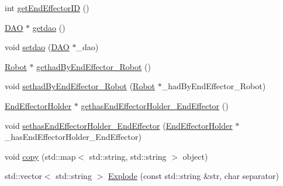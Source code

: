 \begin{DoxyCompactItemize}
\item 
int \hyperlink{class_end_effector_a89452bc420683832af0e2d55f10b6435}{getEndEffectorID} ()
\item 
\hyperlink{class_d_a_o}{DAO} $\ast$ \hyperlink{class_end_effector_ab4e27c958cdd62573d064acde55d6304}{getdao} ()
\item 
void \hyperlink{class_end_effector_a68f208f457189aa356951442d5692b08}{setdao} (\hyperlink{class_d_a_o}{DAO} $\ast$\_\-dao)
\item 
\hyperlink{class_robot}{Robot} $\ast$ \hyperlink{class_end_effector_a4eb16ef6e361e33561f4f1791296c831}{gethadByEndEffector\_\-Robot} ()
\item 
void \hyperlink{class_end_effector_a5b47bcb2d71bdd47fc669cab55dd95f1}{sethadByEndEffector\_\-Robot} (\hyperlink{class_robot}{Robot} $\ast$\_\-hadByEndEffector\_\-Robot)
\item 
\hyperlink{class_end_effector_holder}{EndEffectorHolder} $\ast$ \hyperlink{class_end_effector_a5414f06b3c972765027c55f42f7f4fa8}{gethasEndEffectorHolder\_\-EndEffector} ()
\item 
void \hyperlink{class_end_effector_a92135e5590b09cc347f921107dbde707}{sethasEndEffectorHolder\_\-EndEffector} (\hyperlink{class_end_effector_holder}{EndEffectorHolder} $\ast$\_\-hasEndEffectorHolder\_\-EndEffector)
\item 
void \hyperlink{class_end_effector_a60c32047ac0826ef80a10b8477132d7c}{copy} (std::map$<$ std::string, std::string $>$ object)
\item 
std::vector$<$ std::string $>$ \hyperlink{class_end_effector_a29555a56acdff435557ac14e5d3dcd47}{Explode} (const std::string \&str, char separator)
\end{DoxyCompactItemize}


